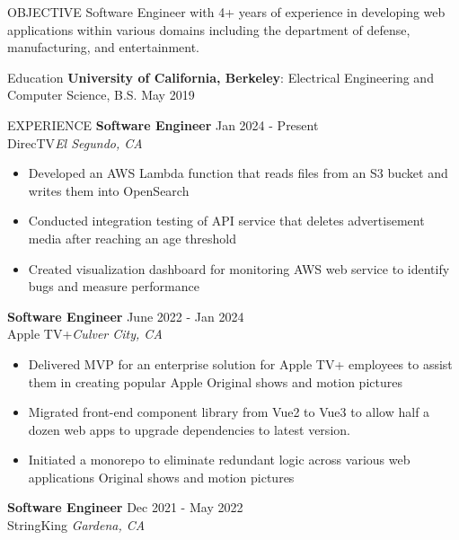 \documentclass{resume}
\begin{document}
    \begin{rSection}{OBJECTIVE}
        {Software Engineer with 4+ years of experience in developing web applications within various domains including the department of defense, manufacturing, and entertainment.}
    \end{rSection}

    \begin{rSection}{Education}
        {\bf University of California, Berkeley}: Electrical Engineering and Computer Science, B.S. \hfill {May 2019}
    \end{rSection}

    \begin{rSection}{EXPERIENCE}
        \textbf{Software Engineer} \hfill Jan 2024 - Present\\
        DirecTV\hfill \textit{El Segundo, CA}
        \begin{itemize}
            \itemsep -3pt {}
            \item Developed an AWS Lambda function that reads files from an S3 bucket and writes them into OpenSearch
            \item Conducted integration testing of API service that deletes advertisement media after reaching an age threshold
            \item Created visualization dashboard for monitoring AWS web service to identify bugs and measure performance
        \end{itemize}
        \textbf{Software Engineer} \hfill June 2022 - Jan 2024\\
        Apple TV+\hfill \textit{Culver City, CA}
        \begin{itemize}
            \itemsep -3pt {} 
            \item Delivered MVP for an enterprise solution for Apple TV+ employees to assist them in creating popular Apple Original shows and motion pictures
            \item Migrated front-end component library from Vue2 to Vue3 to allow half a dozen web apps to upgrade dependencies to latest version.
            \item Initiated a monorepo to eliminate redundant logic across various web applications
Original shows and motion pictures
        \end{itemize}
        \textbf{Software Engineer} \hfill Dec 2021 - May 2022\\
        StringKing \hfill \textit{Gardena, CA}
        \begin{itemize}
            \itemsep -3pt {} 

\end{itemize}
\end{rSection}
\end{document}
